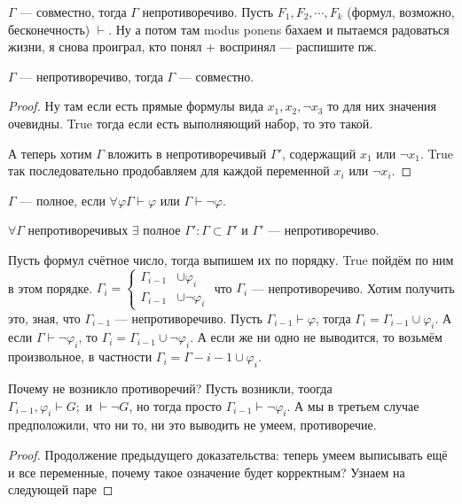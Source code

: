 \begin{statement}
	$\Gamma$ --- совместно, тогда $\Gamma$ непротиворечиво. Пусть $F_1, F_2, \cdots, F_k$ (формул, возможно, бесконечность) $\vdash$. Ну а потом там modus ponens бахаем и пытаемся радоваться жизни, я снова проиграл, кто понял + воспринял --- распишите пж.
\end{statement}
\begin{statement}
	$\Gamma$ --- непротиворечиво, тогда $\Gamma$ --- совместно. 
\end{statement}
\begin{proof}
	Ну там если есть прямые формулы вида $x_1, x_2, \lnot x_3$ то для них значения очевидны. True тогда если есть выполняющий набор, то это такой.

	А теперь хотим $\Gamma$ вложить в непротиворечивый $\Gamma'$, содержащий $x_1$ или $\lnot x_1$. True так последовательно продобавляем для каждой переменной $x_i$ или $\lnot x_i$. 
\end{proof}
\begin{definition}
	$\Gamma$ --- полное, если $\forall \varphi \Gamma \vdash \varphi$ или $\Gamma \vdash \lnot \varphi$.
\end{definition}
\begin{statement}
	$\forall \Gamma $ непротиворечивых $\exists$ полное $\Gamma': \Gamma \subset \Gamma'$ и $\Gamma'$ --- непротиворечиво.

	Пусть формул счётное число, тогда выпишем их по порядку. True пойдём по ним в этом порядке. $\Gamma_{i} = \left\{ \begin{aligned} \Gamma_{i-1} &\cup \varphi_i \\ \Gamma_{i-1} &\cup \lnot \varphi_i \end{aligned} \right.$ что $\Gamma_{i}$ --- непротиворечиво. Хотим получить это, зная, что $\Gamma_{i-1}$ --- непротиворечиво. Пусть $\Gamma_{i-1} \vdash \varphi$, тогда $\Gamma_i = \Gamma_{i-1} \cup \varphi_i$. А если $\Gamma \vdash \lnot \varphi_i$, то $\Gamma_i = \Gamma_{i-1} \cup \lnot \varphi_i$. А если же ни одно не выводится, то возьмём произвольное, в частности $\Gamma_i = \Gamma-{i-1} \cup \varphi_i$. 

	Почему не возникло противоречий? Пусть возникли, тоогда $\Gamma_{i-1}, \varphi_i \vdash G; \text{ и } \vdash \lnot G$, но тогда просто $\Gamma_{i-1} \vdash \lnot \varphi_i$. А мы в третьем случае предположили, что ни то, ни это выводить не умеем, противоречие. 
\end{statement}

\begin{proof}
	Продолжение предыдущего доказательства: теперь умеем выписывать ещё и все переменные, почему такое означение будет корректным? Узнаем на следующей паре
\end{proof}

